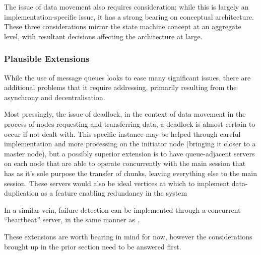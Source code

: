 The issue of data movement also requires consideration; while this is
largely an implementation-specific issue, it has a strong bearing on
conceptual architecture. These three considerations mirror the state
machine concept at an aggregate level, with resultant decisions
affecting the architecture at large.

\subsubsection{Plausible Extensions}\label{plausible-extensions}

While the use of message queues looks to ease many significant issues,
there are additional problems that it require addressing, primarily
resulting from the asynchrony and decentralisation.

Most pressingly, the issue of deadlock, in the context of data movement
in the process of nodes requesting and transferring data, a deadlock is
almost certain to occur if not dealt with. This specific instance may be
helped through careful implementation and more processing on the
initiator node (bringing it closer to a master node), but a possibly
superior extension is to have queue-adjacent servers on each node that
are able to operate concurrently with the main \R session that has as
it's sole purpose the transfer of chunks, leaving everything else to the
main \R session. These servers would also be ideal vertices at which to
implement data-duplication as a feature enabling redundancy in the
system

In a similar vein, failure detection can be implemented through a
concurrent ``heartbeat'' server, in the same manner as 
\cite{white2012hadoop}.

These extensions are worth bearing in mind for now, however the
considerations brought up in the prior section need to be answered
first.
